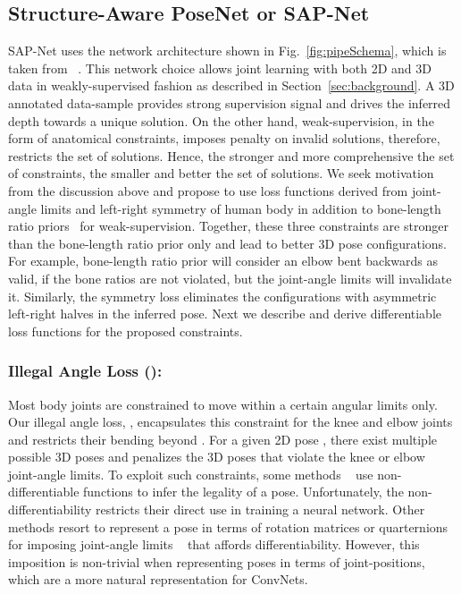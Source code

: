 \documentclass[runningheads]{llncs}
\begin{document}
\subsection{Structure-Aware PoseNet or SAP-Net}
SAP-Net uses the network architecture shown in Fig.~\ref{fig:pipeSchema}, which is taken from ~\cite{Zhou_2017_ICCV}. This network choice allows joint learning with both 2D and 3D data in weakly-supervised fashion as described in Section~\ref{sec:background}. A 3D annotated data-sample provides strong supervision signal and drives the inferred depth towards a unique solution. On the other hand, weak-supervision, in the form of anatomical constraints, imposes penalty on invalid solutions, therefore, restricts the set of solutions. Hence, the stronger and more comprehensive the set of constraints, the smaller and better the set of solutions. We seek motivation from the discussion above and propose to use loss functions derived from joint-angle limits and left-right symmetry of human body in addition to bone-length ratio priors~\cite{Zhou_2017_ICCV} for weak-supervision. Together, these three constraints are stronger than the bone-length ratio prior only and lead to better 3D pose configurations. For example, bone-length ratio prior will consider an elbow bent backwards as valid, if the bone ratios are not violated, but the joint-angle limits will invalidate it. Similarly, the symmetry loss eliminates the configurations with asymmetric left-right halves in the inferred pose. Next we describe and derive differentiable loss functions for the proposed constraints. 

\vspace{-1em}
\subsubsection{Illegal Angle Loss ():} Most body joints are constrained to move within a certain angular limits only. Our illegal angle loss,  , encapsulates this constraint for the knee and elbow joints and restricts their bending beyond . For a given 2D pose , there exist multiple possible 3D poses and  penalizes the 3D poses that violate the knee or elbow joint-angle limits. To exploit such constraints, some methods ~\cite{HERDA2005189,akhter2015pose,ChenNie2013TIP} use non-differentiable functions to infer the legality of a pose. Unfortunately, the non-differentiability restricts their direct use in training a neural network. 
Other methods resort to represent a pose in terms of rotation matrices or quarternions for imposing joint-angle limits ~\cite{akhter2015pose,Wei:2010} that affords differentiability. However, this imposition is non-trivial when representing poses in terms of joint-positions, which are a more natural representation for ConvNets. 
\end{document}
